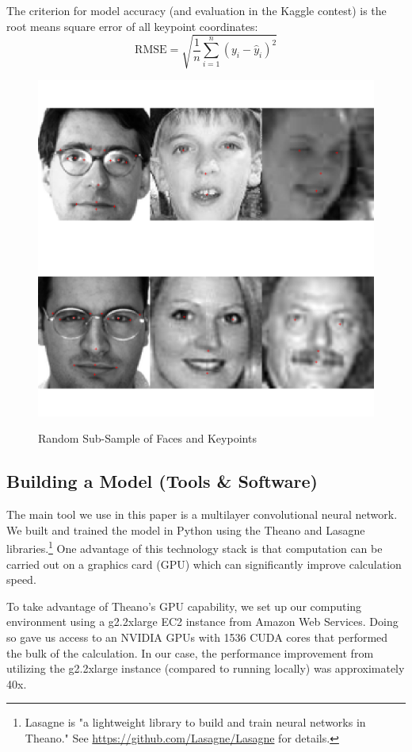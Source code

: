 \documentclass[journal]{IEEEtran}
\begin{document}
The criterion for model accuracy (and evaluation in the Kaggle contest) is the root means square error of all keypoint coordinates:
\[ \text{RMSE}=\sqrt{\frac{1}{n} \sum_{i=1}^{n} \left( y_i - \hat{y}_i\right)^2} \]

\begin{figure}[!ht]
  \centering
  \caption{Random Sub-Sample of Faces and Keypoints}
  \includegraphics[scale=.6]{random_faces.pdf}
  \label{fig:random_faces}
\end{figure}

\subsection{Building a Model (Tools \& Software)}

The main tool we use in this paper is a multilayer convolutional neural network. We built and trained the model in Python using the Theano and Lasagne libraries.\footnote{Lasagne is "a lightweight library to build and train neural networks in Theano." See \url{https://github.com/Lasagne/Lasagne} for details.} One advantage of this technology stack is that computation can be carried out on a graphics card (GPU) which can significantly improve calculation speed.

To take advantage of Theano's GPU capability, we set up our computing environment using a g2.2xlarge EC2 instance from Amazon Web Services. Doing so gave us access to an NVIDIA GPUs with 1536 CUDA cores that performed the bulk of the calculation. In our case, the performance improvement from utilizing the g2.2xlarge instance (compared to running locally) was approximately 40x.
\end{document}
